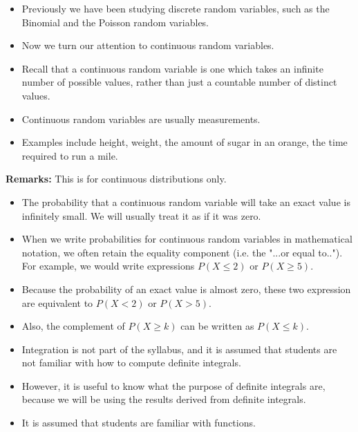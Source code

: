\documentclass[12pt]{report}
\begin{document}
\begin{itemize}
	\item Previously we have been studying discrete random variables, such as the Binomial and the Poisson random variables.
	\item Now we turn our attention to continuous random variables.
	\item Recall that a continuous random variable is one which takes an infinite number of possible values, rather than just a countable number of distinct values.
	\item Continuous random variables are usually measurements.
	\item Examples include height, weight, the amount of sugar in an orange, the time required to run a mile.
\end{itemize}
{\LARGE
	\large
	\textbf{Remarks:} This is for continuous distributions only.
	\begin{itemize}
		\item The probability that a continuous random variable will take an exact value is infinitely small.
		We will usually treat it as if it was zero.
		\item
		When we write probabilities for continuous random variables in mathematical notation, we often retain the equality component (i.e. the "...or equal to..").\\
		For example, we would write expressions $P(X \leq 2)$ or $P(X \geq 5)$.
		\item
		Because the probability of an exact value is almost zero, these two expression are equivalent to $P(X < 2)$
		or $P(X > 5)$. \item Also, the complement of $P(X \geq k)$ can be written as $P(X \leq k)$.
	\end{itemize}
}
\begin{itemize}
	\item Integration is not part of the syllabus, and it is assumed that students are not familiar with how to compute definite integrals.
	\item However,  it is useful to know what the purpose of definite integrals are, because we will be using the results derived from definite integrals. \item It is assumed that students are familiar with functions.
\end{itemize}
\end{document}
